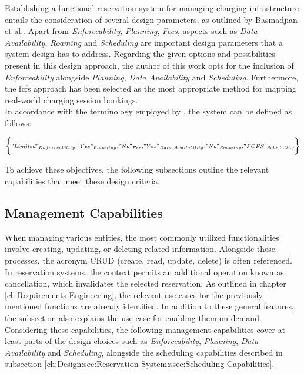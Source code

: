 Establishing a functional reservation system for managing charging infrastructure entails the consideration of several design parameters, as outlined by Basmadjian et al.\cite{basmadjian_reference_2020}. Apart from \textit{Enforceability}, \textit{Planning}, \textit{Fees}, aspects such as \textit{Data Availability}, \textit{Roaming} and \textit{Scheduling} are important design parameters that a system design has to address.
Regarding the given options and possibilities present in this design approach, the author of this work opts for the inclusion of \textit{Enforceability} alongside \textit{Planning}, \textit{Data Availability} and \textit{Scheduling}. 
Furthermore, the \acrshort{fcfs} approach has been selected as the most appropriate method for mapping real-world charging session bookings.\\
\noindent In accordance with the terminology employed by \cite{basmadjian_reference_2020}, the system can be defined as follows:

\begin{eqnarray*}
\scriptstyle \biggl\{ "Limited"_{Enforceability}, "Yes"_{Planning}, "No"_{Fee}, "Yes"_{Data\ Availability}, "No"_{Roaming}, "FCFS"_{Scheduling} \biggr\}
\end{eqnarray*}

\noindent To achieve these objectives, the following subsections outline the relevant capabilities that meet these design criteria.

\subsection{Management Capabilities}
\label{ch:Design:sec:Reservation System:ssec:Management Capabilities}

When managing various entities, the most commonly utilized functionalities involve creating, updating, or deleting related information. Alongside these processes, the acronym CRUD (create, read, update, delete) is often referenced. In reservation systems, the context permits an additional operation known as cancellation, which invalidates the selected reservation.
As outlined in chapter \ref{ch:Requirements Engineering}, the relevant use cases for the previously mentioned functions are already identified. In addition to these general features, the subsection also explains the use case for enabling them on demand.
Considering these capabilities, the following management capabilities cover at least parts of the design choices such as \textit{Enforceability}, \textit{Planning}, \textit{Data Availability} and \textit{Scheduling}, alongside the scheduling capabilities described in subsection \ref{ch:Design:sec:Reservation System:ssec:Scheduling Capabilities}.


